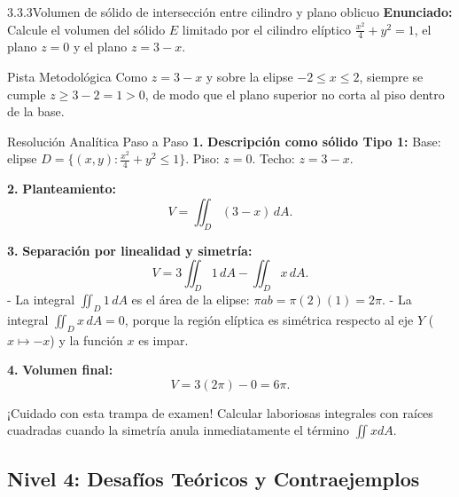 \documentclass[11pt,a4paper]{article}
\begin{document}
\begin{nivelbox}{3.3.3}{Volumen de sólido de intersección entre cilindro y plano oblicuo}
\textbf{Enunciado:}\\
Calcule el volumen del sólido $E$ limitado por el cilindro elíptico $\frac{x^2}{4} + y^2 = 1$, el plano $z = 0$ y el plano $z = 3 - x$.

\begin{observacionbox}{Pista Metodológica}
Como $z = 3 - x$ y sobre la elipse $-2 \le x \le 2$, siempre se cumple $z \ge 3 - 2 = 1 > 0$, de modo que el plano superior no corta al piso dentro de la base.
\end{observacionbox}

\begin{ejerciciobox}{Resolución Analítica Paso a Paso}
\smallskip\noindent\textbf{1.} \textbf{Descripción como sólido Tipo 1:}
Base: elipse $D = \{ (x,y) : \frac{x^2}{4} + y^2 \le 1 \}$.
Piso: $z = 0$. Techo: $z = 3 - x$.

\smallskip\noindent\textbf{2.} \textbf{Planteamiento:}
\[V = \iint_D (3 - x) \, dA.\]

\smallskip\noindent\textbf{3.} \textbf{Separación por linealidad y simetría:}
\[V = 3 \iint_D 1 \, dA - \iint_D x \, dA.\]
- La integral $\iint_D 1 \, dA$ es el área de la elipse: $\pi a b = \pi (2)(1) = 2\pi$.
- La integral $\iint_D x \, dA = 0$, porque la región elíptica es simétrica respecto al eje $Y$ ($x \mapsto -x$) y la función $x$ es impar.

\smallskip\noindent\textbf{4.} \textbf{Volumen final:}
\[V = 3(2\pi) - 0 = 6\pi.\]
\end{ejerciciobox}

\begin{errorbox}{¡Cuidado con esta trampa de examen!}
Calcular laboriosas integrales con raíces cuadradas cuando la simetría anula inmediatamente el término $\iint x dA$.
\end{errorbox}
\end{nivelbox}
\bigskip

\subsection{Nivel 4: Desafíos Teóricos y Contraejemplos}
\end{document}
